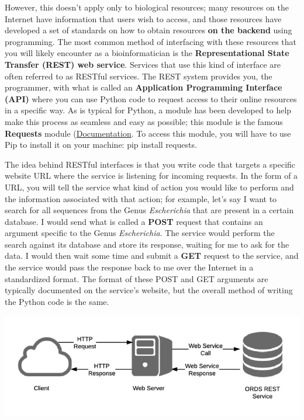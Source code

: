 \documentclass[a4paper,11pt]{article}
\begin{document}
However, this doesn't apply only to biological resources; many resources on the Internet 
have information that users wish to access, and those resources have developed a set of 
standards on how to obtain resources \textbf{on the backend} using programming.  The most 
common method of interfacing with these resources that you will likely encounter as a 
bioinformatician is the \textbf{Representational State Transfer (REST) web service}.  Services 
that use this kind of interface are often referred to as RESTful services.  The REST system 
provides you, the programmer, with what is called an \textbf{Application Programming Interface (API)} 
where you can use Python code to request access to their online resources in a specific way.  
As is typical for Python, a module has been developed to help make this process as seamless and 
easy as possible; this module is the famous \textbf{Requests} module 
(\href{http://docs.python-requests.org/en/master/}{Documentation}.  To access this module, 
you will have to use Pip to install it on your machine: pip install requests. \par

The idea behind RESTful interfaces is that you write code that targets a specific website URL 
where the service is listening for incoming requests.  In the form of a URL, you will tell the 
service what kind of action you would like to perform and the information associated with that 
action; for example, let's say I want to search for all sequences from the Genus \textit{Escherichia} 
that are present in a certain database.  I would send what is called a \textbf{POST} request that 
contains an argument specific to the Genus \textit{Escherichia}.  The service would perform the 
search against its database and store its response, waiting for me to ask for the data.  I would 
then wait some time and submit a \textbf{GET} request to the service, and the service would 
pass the response back to me over the Internet in a standardized format.  The format of  
these POST and GET arguments are typically documented on the service's website, but the 
overall method of writing the Python code is the same. \par

\includegraphics{images/rest.png}
\end{document}
